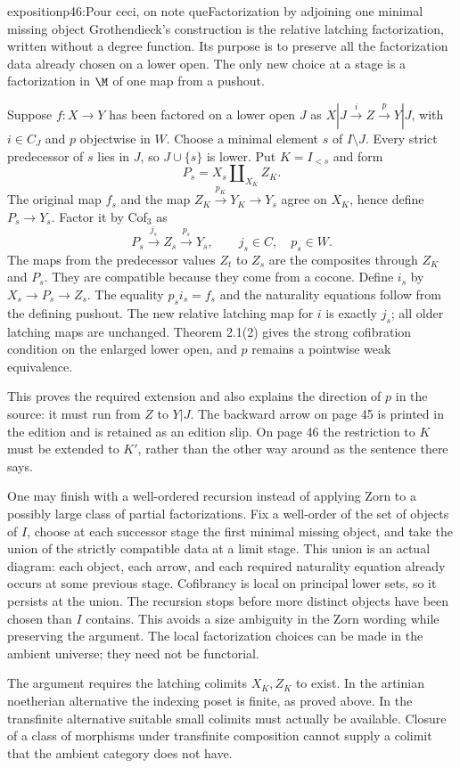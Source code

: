 \begin{dcomment}{exposition}{p46:Pour ceci, on note que}{Factorization by adjoining one minimal missing object}
Grothendieck's construction is the relative latching factorization, written without a degree function. Its purpose is to preserve all the factorization data already chosen on a lower open. The only new choice at a stage is a factorization in $\M$ of one map from a pushout.

Suppose $f:X\to Y$ has been factored on a lower open $J$ as $X|J\xrightarrow{i}Z\xrightarrow{p}Y|J$, with $i\in C_J$ and $p$ objectwise in $W$. Choose a minimal element $s$ of $I\setminus J$. Every strict predecessor of $s$ lies in $J$, so $J\cup\{s\}$ is lower. Put $K=I_{<s}$ and form
\[
 P_s=X_s\amalg_{X_K}Z_K.
\]
The original map $f_s$ and the map $Z_K\xrightarrow{p_K}Y_K\to Y_s$ agree on $X_K$, hence define $P_s\to Y_s$. Factor it by Cof$_3$ as
\[
 P_s\xrightarrow{j_s}Z_s\xrightarrow{p_s}Y_s,
 \qquad j_s\in C,\quad p_s\in W.
\]
The maps from the predecessor values $Z_t$ to $Z_s$ are the composites through $Z_K$ and $P_s$. They are compatible because they come from a cocone. Define $i_s$ by $X_s\to P_s\to Z_s$. The equality $p_si_s=f_s$ and the naturality equations follow from the defining pushout. The new relative latching map for $i$ is exactly $j_s$; all older latching maps are unchanged. Theorem 2.1(2) gives the strong cofibration condition on the enlarged lower open, and $p$ remains a pointwise weak equivalence.

This proves the required extension and also explains the direction of $p$ in the source: it must run from $Z$ to $Y|J$. The backward arrow on page 45 is printed in the edition and is retained as an edition slip. On page 46 the restriction to $K$ must be extended to $K'$, rather than the other way around as the sentence there says.

One may finish with a well-ordered recursion instead of applying Zorn to a possibly large class of partial factorizations. Fix a well-order of the set of objects of $I$, choose at each successor stage the first minimal missing object, and take the union of the strictly compatible data at a limit stage. This union is an actual diagram: each object, each arrow, and each required naturality equation already occurs at some previous stage. Cofibrancy is local on principal lower sets, so it persists at the union. The recursion stops before more distinct objects have been chosen than $I$ contains. This avoids a size ambiguity in the Zorn wording while preserving the argument. The local factorization choices can be made in the ambient universe; they need not be functorial.

The argument requires the latching colimits $X_K,Z_K$ to exist. In the artinian noetherian alternative the indexing poset is finite, as proved above. In the transfinite alternative suitable small colimits must actually be available. Closure of a class of morphisms under transfinite composition cannot supply a colimit that the ambient category does not have.
\end{dcomment}

